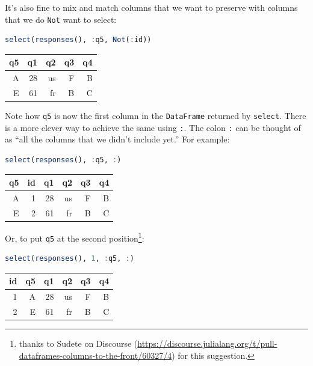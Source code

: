 \documentclass[
  notoc %
]{tufte-book}
\newcommand{\passthrough}[1]{#1}
\begin{document}
It's also fine to mix and match columns that we want to preserve with
columns that we do \passthrough{\lstinline!Not!} want to select:

\begin{lstlisting}[language=Julia]
select(responses(), :q5, Not(:id))
\end{lstlisting}

\begin{longtable}[]{@{}rrrrr@{}}
\toprule
q5 & q1 & q2 & q3 & q4 \\
\midrule
\endhead
A & 28 & us & F & B \\
E & 61 & fr & B & C \\
\bottomrule
\end{longtable}

Note how \passthrough{\lstinline!q5!} is now the first column in the
\passthrough{\lstinline!DataFrame!} returned by
\passthrough{\lstinline!select!}. There is a more clever way to achieve
the same using \passthrough{\lstinline!:!}. The colon
\passthrough{\lstinline!:!} can be thought of as ``all the columns that
we didn't include yet.'' For example:

\begin{lstlisting}[language=Julia]
select(responses(), :q5, :)
\end{lstlisting}

\begin{longtable}[]{@{}rrrrrr@{}}
\toprule
q5 & id & q1 & q2 & q3 & q4 \\
\midrule
\endhead
A & 1 & 28 & us & F & B \\
E & 2 & 61 & fr & B & C \\
\bottomrule
\end{longtable}

Or, to put \passthrough{\lstinline!q5!} at the second
position\footnote{thanks to Sudete on Discourse
  (\url{https://discourse.julialang.org/t/pull-dataframes-columns-to-the-front/60327/4})
  for this suggestion.}:

\begin{lstlisting}[language=Julia]
select(responses(), 1, :q5, :)
\end{lstlisting}

\begin{longtable}[]{@{}rrrrrr@{}}
\toprule
id & q5 & q1 & q2 & q3 & q4 \\
\midrule
\endhead
1 & A & 28 & us & F & B \\
2 & E & 61 & fr & B & C \\
\bottomrule
\end{longtable}
\end{document}
